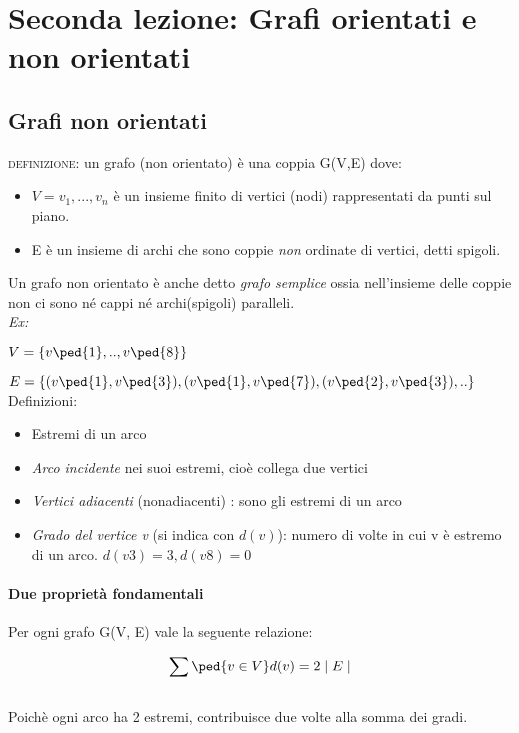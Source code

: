 
\section{Seconda lezione: Grafi orientati e non orientati}
\subsection{Grafi non orientati}
\textsc{definizione:} un grafo (non orientato) è una coppia G(V,E) dove:
\begin{itemize}
    \item \( V={v_1, ...,v_n} \) è un insieme finito di vertici (nodi) rappresentati da punti sul piano.
    \item E è un insieme di archi che sono coppie \emph{non} ordinate di vertici, detti spigoli.
\end{itemize}
Un grafo non orientato è anche detto \emph{grafo semplice} ossia nell'insieme delle coppie non ci sono né cappi né archi(spigoli) paralleli.\\

\textit{Ex:} \par
\( V = \{ v\ped{1}, .. , v\ped{8} \} \) \par
\( E = \{ (v\ped{1}, v\ped{3}), (v\ped{1}, v\ped{7}), (v\ped{2}, v\ped{3}), .. \} \) \\

Definizioni:
\begin{itemize}
    \item Estremi di un arco
    \item \emph{Arco incidente} nei suoi estremi, cioè collega due vertici
    \item \emph{Vertici adiacenti} (nonadiacenti) : sono gli estremi di un arco
    \item \emph{Grado del vertice v} (si indica con $d(v)$): numero di volte in cui v è estremo di un arco. \(d(v3)=3, d(v8)=0 \)
\end{itemize}

\paragraph{Due proprietà fondamentali} Per ogni grafo G(V, E) vale la seguente relazione:

    \begin{equation}
        \sum \ped{v \in V} d(v) = 2 \mid E \mid 
    \end{equation} \\

    Poichè ogni arco ha 2 estremi, contribuisce due volte alla somma dei gradi. \\

